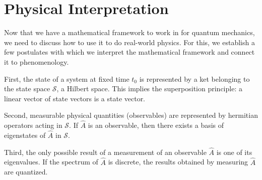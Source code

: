 \chapter{Physical Interpretation}

Now that we have a mathematical framework to work in for quantum mechanics, we need to discuss how to use it to do real-world physics.
For this, we establish a few postulates with which we interpret the mathematical framework and connect it to phenomenology.

First, the state of a system at fixed time $t_0$ is represented by a ket belonging to the state space $\mathcal{S}$, a Hilbert space.
This implies the superposition principle: a linear vector of state vectors is a state vector.

Second, measurable physical quantities (observables) are represented by hermitian operators acting in $\mathcal{S}$.
If $\hat{A}$ is an observable, then there exists a basis of eigenstates of $\hat{A}$ in $\mathcal{S}$.

Third, the only possible result of a measurement of an observable $\hat{A}$ is one of its eigenvalues.
If the spectrum of $\hat{A}$ is discrete, the results obtained by measuring $\hat{A}$ are quantized.

